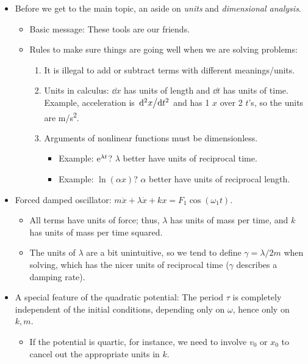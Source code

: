 \documentclass[../notes.tex]{subfiles}
\begin{document}
\begin{itemize}
\begin{itemize}
    \end{itemize}
    \item Before we get to the main topic, an aside on \emph{units} and \emph{dimensional analysis}.
    \begin{itemize}
        \item Basic message: These tools are our friends.
        \item Rules to make sure things are going well when we are solving problems:
        \begin{enumerate}
            \item It is illegal to add or subtract terms with different meanings/units.
            \item Units in calculus: $\dd{x}$ has units of length and $\dd{t}$ has units of time. Example, acceleration is $\dv*[2]{x}{t}$ and has 1 $x$ over 2 $t$'s, so the units are \si[per-mode=symbol]{\meter\per\second\squared}.
            \item Arguments of nonlinear functions must be dimensionless.
            \begin{itemize}
                \item Example: $\e[\lambda t]$? $\lambda$ better have units of reciprocal time.
                \item Example: $\ln(\alpha x)$? $\alpha$ better have units of reciprocal length.
            \end{itemize}
        \end{enumerate}
    \end{itemize}
    \item Forced damped oscillator: $m\ddot{x}+\lambda\dot{x}+kx=F_1\cos(\omega_1t)$.
    \begin{itemize}
        \item All terms have units of force; thus, $\lambda$ has units of mass per time, and $k$ has units of mass per time squared.
        \item The units of $\lambda$ are a bit unintuitive, so we tend to define $\gamma=\lambda/2m$ when solving, which has the nicer units of reciprocal time ($\gamma$ describes a damping rate).
    \end{itemize}
    \item A special feature of the quadratic potential: The period $\tau$ is completely independent of the initial conditions, depending only on $\omega$, hence only on $k,m$.
    \begin{itemize}
        \item If the potential is quartic, for instance, we need to involve $v_0$ or $x_0$ to cancel out the appropriate units in $k$.

\end{itemize}
\end{itemize}
\end{document}
